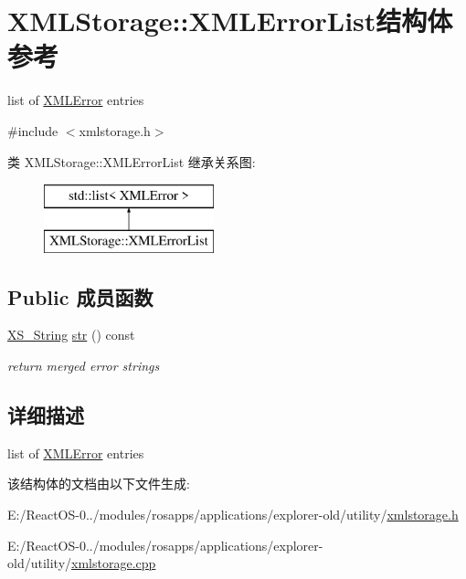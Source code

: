 \hypertarget{struct_x_m_l_storage_1_1_x_m_l_error_list}{}\section{X\+M\+L\+Storage\+:\+:X\+M\+L\+Error\+List结构体 参考}
\label{struct_x_m_l_storage_1_1_x_m_l_error_list}


list of \hyperlink{struct_x_m_l_storage_1_1_x_m_l_error}{X\+M\+L\+Error} entries  




{\ttfamily \#include $<$xmlstorage.\+h$>$}

类 X\+M\+L\+Storage\+:\+:X\+M\+L\+Error\+List 继承关系图\+:\begin{figure}[H]
\begin{center}
\leavevmode
\includegraphics[height=2.000000cm]{struct_x_m_l_storage_1_1_x_m_l_error_list}
\end{center}
\end{figure}
\subsection*{Public 成员函数}
\begin{DoxyCompactItemize}
\item 
\mbox{\label{struct_x_m_l_storage_1_1_x_m_l_error_list_a6f4c21a0079c527a73f51a904e39cadc}} 
\hyperlink{struct_x_m_l_storage_1_1_x_s___string}{X\+S\+\_\+\+String} \hyperlink{struct_x_m_l_storage_1_1_x_m_l_error_list_a6f4c21a0079c527a73f51a904e39cadc}{str} () const
\begin{DoxyCompactList}\small\item\em return merged error strings \end{DoxyCompactList}\end{DoxyCompactItemize}


\subsection{详细描述}
list of \hyperlink{struct_x_m_l_storage_1_1_x_m_l_error}{X\+M\+L\+Error} entries 

该结构体的文档由以下文件生成\+:\begin{DoxyCompactItemize}
\item 
E\+:/\+React\+O\+S-\/0../modules/rosapps/applications/explorer-\/old/utility/\hyperlink{xmlstorage_8h}{xmlstorage.\+h}\item 
E\+:/\+React\+O\+S-\/0../modules/rosapps/applications/explorer-\/old/utility/\hyperlink{xmlstorage_8cpp}{xmlstorage.\+cpp}\end{DoxyCompactItemize}
